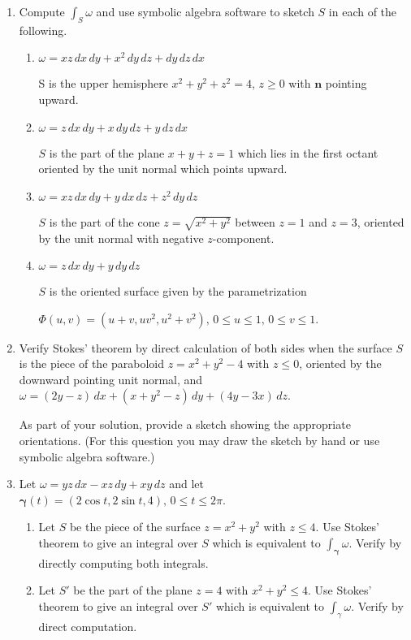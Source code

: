 \documentclass{article}
\begin{document}
\begin{enumerate}
    \newpage
    \item Compute $\displaystyle \int_S \omega$ and use symbolic algebra software to sketch $S$ in each of the following.
    \begin{enumerate}
        \item $\omega = xz \, dx \, dy + x^2 \, dy \, dz + dy \, dz \, dx$
  
        S is the upper hemisphere $x^2 + y^2 + z^2 = 4$, $z \geq 0$ with $\boldsymbol n$ pointing upward.


        \item $\omega = z \, dx \, dy + x \, dy \, dz + y \, dz \, dx$

        $S$ is the part of the plane $x+y+z = 1$ which lies in the first octant oriented by the unit normal which points upward.

        \item $\omega  = xz \, dx \, dy + y \, dx \, dz + z^2 \, dy \, dz$

        $S$ is the part of the cone $z = \sqrt{x^2 + y^2}$ between $z=1$ and $z=3$,  oriented by the unit normal with negative $z$-component.

        \item $\omega = z \, dx \, dy + y \, dy \, dz$

        $S$ is the oriented surface given by the parametrization

        $\Phi (u,v) = (u+v, uv^2, u^2 + v^2),\, 0 \leq u \leq 1,\, 0\leq v \leq 1$.
    \end{enumerate}

    \newpage
    \item Verify Stokes' theorem by direct calculation of both sides when the surface $S$ is the piece of the paraboloid $z= x^2 + y^2 - 4$ with $z \leq 0$, oriented by the downward pointing unit normal, and $\omega = (2y-z)\, dx + (x + y^2 - z)\, dy + (4y-3x)\, dz$.

    As part of your solution, provide a sketch showing the appropriate orientations. (For this question you may draw the sketch by hand or use symbolic algebra software.)
    \newpage
    \item Let $\omega = yz\, dx - xz \, dy + xy \, dz$ and let $\boldsymbol \gamma(t) = (2\cos t, 2\sin t, 4),\, 0 \leq t \leq 2\pi$.
    \begin{enumerate}
        \item Let $S$ be the piece of the surface $z = x^2 + y^2$ with $z \leq 4$. Use Stokes' theorem to give an integral over $S$ which is equivalent to $\displaystyle \int_{\boldsymbol \gamma} \omega$. Verify by directly computing both integrals.
        \item Let $S'$ be the part of the plane $z=4$ with $x^2 + y^2 \leq 4$. Use Stokes' theorem to give an integral over $S'$ which is equivalent to $\displaystyle \int_{\gamma} \omega$. Verify by direct computation.
        

\end{enumerate}
\end{enumerate}
\end{document}
